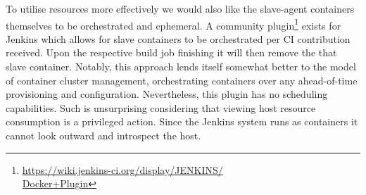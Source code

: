 \documentclass[journal]{IEEEtran}
\begin{document}
To utilise resources more effectively we would also like the slave-agent containers themselves to be orchestrated and ephemeral. 
A community plugin\footnote{\href{https://wiki.jenkins-ci.org/display/JENKINS/Docker+Plugin}{https://wiki.jenkins-ci.org/display/JENKINS/\\Docker+Plugin}} exists 
for Jenkins which allows for slave containers to be orchestrated per CI contribution received. Upon the respective 
build job finishing it will then remove the that slave container. Notably, this approach lends itself somewhat better to
the model of container cluster management, orchestrating containers over any ahead-of-time provisioning and configuration.
Nevertheless, this plugin has no scheduling capabilities. Such is unsurprising considering that viewing host resource consumption 
is a privileged action. Since the Jenkins system runs as containers it cannot look outward and introspect the host.

\end{document}
